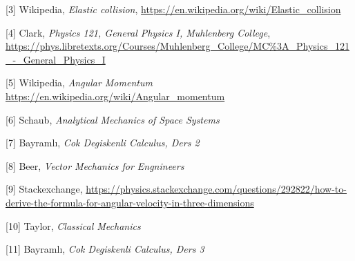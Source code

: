 \documentclass[12pt,fleqn]{article}\usepackage{../../common}
\begin{document}
[3] Wikipedia, {\em Elastic collision}, \url{https://en.wikipedia.org/wiki/Elastic_collision}

[4] Clark, {\em Physics 121, General Physics I, Muhlenberg College},
    \url{https://phys.libretexts.org/Courses/Muhlenberg_College/MC%3A_Physics_121_-_General_Physics_I}

[5] Wikipedia, {\em Angular Momentum}
    \url{https://en.wikipedia.org/wiki/Angular_momentum}

[6] Schaub, {\em Analytical Mechanics of Space Systems}

[7] Bayramlı, {\em Cok Degiskenli Calculus, Ders 2}

[8] Beer, {\em Vector Mechanics for Engnineers}

[9] Stackexchange, \url{https://physics.stackexchange.com/questions/292822/how-to-derive-the-formula-for-angular-velocity-in-three-dimensions}

[10] Taylor, {\em Classical Mechanics}

[11] Bayramlı, {\em Cok Degiskenli Calculus, Ders 3}
\end{document}
